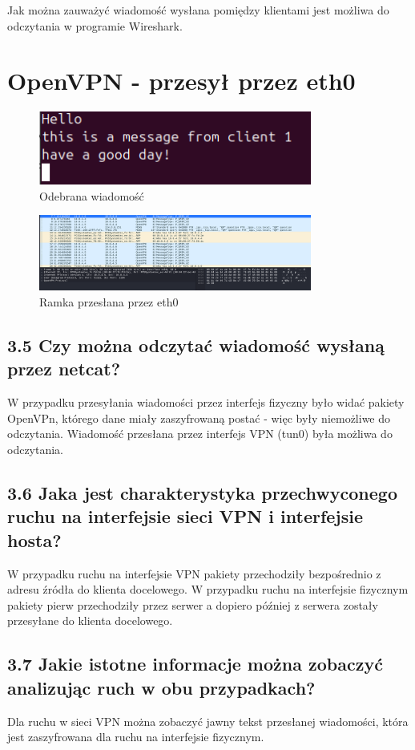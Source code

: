 \documentclass{article}
\begin{document}
Jak można zauważyć wiadomość wysłana pomiędzy klientami jest możliwa do odczytania w programie Wireshark.

\section{OpenVPN - przesył przez eth0}
\begin{figure}[H]
  \centering
  \includegraphics[width=0.8\textwidth]{7_wyslanewiadomosci.png}
  \caption{Odebrana wiadomość}
\end{figure}
\begin{figure}[H]
  \centering
  \includegraphics[width=0.8\textwidth]{8_netcat_eth0.png}
  \caption{Ramka przesłana przez eth0}
\end{figure}


\subsection*{3.5 Czy można odczytać wiadomość wysłaną przez netcat?}
W przypadku przesyłania wiadomości przez interfejs fizyczny było widać pakiety OpenVPn, którego dane miały zaszyfrowaną postać - więc były niemożliwe do odczytania.
Wiadomość przesłana przez interfejs VPN (tun0) była możliwa do odczytania.
\subsection*{3.6 Jaka jest charakterystyka przechwyconego ruchu na interfejsie sieci VPN i
  interfejsie hosta?}
W przypadku ruchu na interfejsie VPN pakiety przechodziły bezpośrednio z adresu źródła do klienta docelowego.
W przypadku ruchu na interfejsie fizycznym pakiety pierw przechodziły przez serwer a dopiero później z serwera zostały przesyłane do klienta docelowego.

\subsection*{3.7 Jakie istotne informacje można zobaczyć analizując ruch w obu przypadkach?}
Dla ruchu w sieci VPN można zobaczyć jawny tekst przesłanej wiadomości, która jest zaszyfrowana dla ruchu na interfejsie fizycznym.
\end{document}
